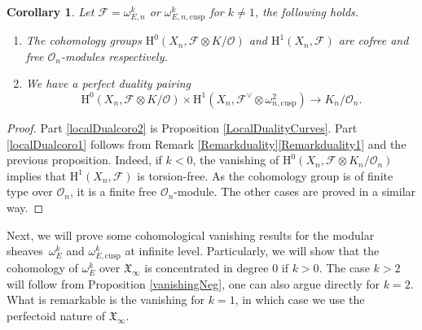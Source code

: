 \documentclass[JEP,XML,SOM,Unicode,published]{cedram}
\newcommand{\cusp}{\mathrm{cusp}}
\numberwithin{equation}{section}
\newtheorem{cor}[prop]{Corollary}
\theoremstyle{definition}
\newcommand{\n}[1]{\mathcal{#1}}
\newcommand{\f}[1]{\mathfrak{#1}}
\begin{document}
\begin{cor}
\label{localDualcoro}
Let $\n{F}=\omega^k_{E,n}$ or $\omega^k_{E,n,\cusp}$ for $k\neq 1$, the following holds.
\begin{enumerate}
\item\label{localDualcoro1} The cohomology groups $\mathrm{H}^0(X_n, \n{F}\otimes K/\n{O})$ and $\mathrm{H}^1(X_n, \n{F})$ are cofree and free $\n{O}_n$-modules respectively.

\item\label{localDualcoro2} We have a perfect duality pairing
\[
\mathrm{H}^0(X_n, \n{F}\otimes K/\n{O})\times \mathrm{H}^1(X_n, \n{F}^\vee \otimes \omega^2_{n,\cusp})\to K_n/\n{O}_n.
\]
\end{enumerate}
\end{cor}

\begin{proof}
Part \eqref{localDualcoro2} is Proposition \ref{LocalDualityCurves}. Part \eqref{localDualcoro1} follows from Remark \ref{Remarkduality}\eqref{Remarkduality1} and the previous proposition. Indeed, if $k<0$, the vanishing of $\mathrm{H}^0(X_n, \n{F}\otimes K_n/\n{O}_n)$ implies that $\mathrm{H}^1(X_n, \n{F})$ is torsion-free. As the cohomology group is of finite type over $\n{O}_n$, it is a finite free $\n{O}_n$-module. The other cases are proved in a similar way.
\end{proof}

Next, we will prove some cohomological vanishing results for the modular sheaves~$\omega_E^k$ and $\omega^k_{E,\cusp}$ at infinite level. Particularly, we will show that the cohomology of $\omega_E^k$ over $\f{X}_{\infty}$ is concentrated in degree $0$ if $k>0$. The case $k> 2$ will follow from Proposition \ref{vanishingNeg}, one can also argue directly for $k=2$. What is remarkable is the vanishing for $k=1$, in which case we use the perfectoid nature of $\f{X}_{\infty}$.
\end{document}
